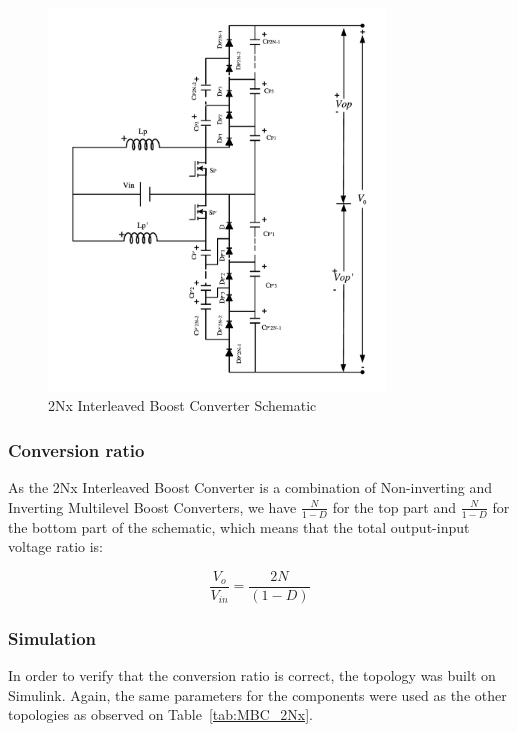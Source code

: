 \begin{figure}[H]
   \centering
   \includegraphics[width=0.8\textwidth]{figures/yMultilevel/2Nx_full.pdf}
    \caption{2Nx Interleaved Boost Converter Schematic}
	\label{fig:MBC_2NxSchematic}
\end{figure}

\subsubsection{Conversion ratio}

As the 2Nx Interleaved Boost Converter is a combination of Non-inverting and Inverting Multilevel Boost Converters, we have $\frac{N}{1-D}$ for the top part and $\frac{N}{1-D}$ for the bottom part of the schematic, which means that the total output-input voltage ratio is:

\begin{equation}
	\frac{V_o}{V_{in}} = \frac{2N}{(1-D)}
	\label{eq:MBC_2NxCR}
\end{equation}



\subsubsection{Simulation}

In order to verify that the conversion ratio is correct,
the topology was built on Simulink. 
Again, the same parameters for the components were used as the other topologies as observed on Table~\ref{tab:MBC_2Nx}.

